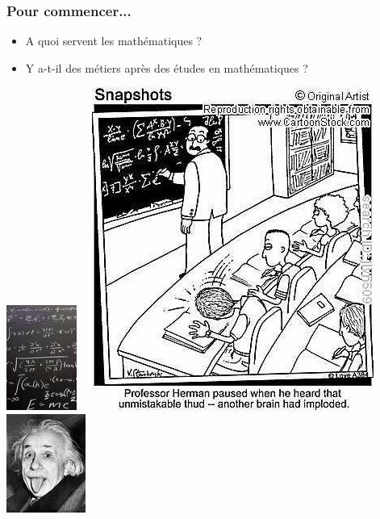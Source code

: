 \documentclass[slideopt,A4]{beamer}
\begin{document}
\begin{frame}
\frametitle{Pour commencer...}

%
%
\begin{itemize}
\item {\large A quoi servent les mathématiques ?}
\item  {\large Y a-t-il des métiers après des études en mathématiques ?}
\end{itemize}
%
\begin{center}
\includegraphics[width=0.20\linewidth]{maths2}$\quad$
\includegraphics[width=0.27\linewidth]{maths1}$\quad$
\includegraphics[width=0.24\linewidth]{einstein}
\end{center}

%
\end{frame}



\end{document}
